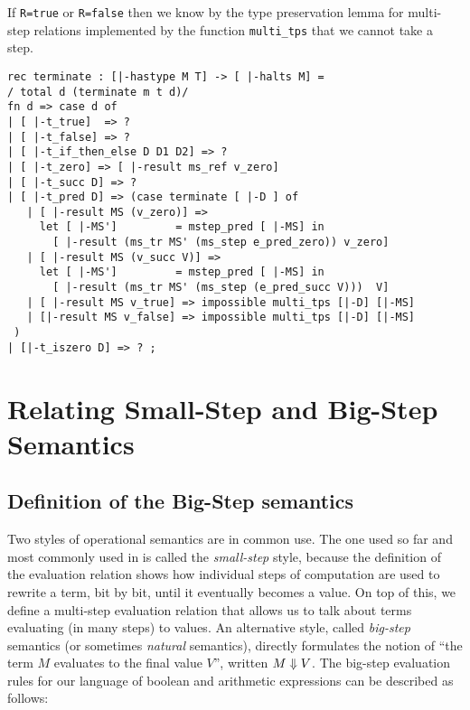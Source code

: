 If \lstinline!R=true! or \lstinline!R=false! then we know by the type
preservation lemma for multi-step relations implemented by the
function \lstinline!multi_tps! that we cannot take a step.



\begin{lstlisting}
rec terminate : [|-hastype M T] -> [ |-halts M] =
/ total d (terminate m t d)/
fn d => case d of
| [ |-t_true]  => ?
| [ |-t_false] => ?
| [ |-t_if_then_else D D1 D2] => ?
| [ |-t_zero] => [ |-result ms_ref v_zero]
| [ |-t_succ D] => ?
| [ |-t_pred D] => (case terminate [ |-D ] of
   | [ |-result MS (v_zero)] =>
     let [ |-MS']         = mstep_pred [ |-MS] in
       [ |-result (ms_tr MS' (ms_step e_pred_zero)) v_zero]
   | [ |-result MS (v_succ V)] =>
     let [ |-MS']         = mstep_pred [ |-MS] in
       [ |-result (ms_tr MS' (ms_step (e_pred_succ V)))  V]
   | [ |-result MS v_true] => impossible multi_tps [|-D] [|-MS]
   | [|-result MS v_false] => impossible multi_tps [|-D] [|-MS]
 )
| [|-t_iszero D] => ? ;
\end{lstlisting}


\section{Relating Small-Step and Big-Step Semantics}
\label{sec:small-to-big}
\subsection{Definition of the Big-Step semantics}

Two styles of operational semantics are in common use. The one used so far and
most commonly used in \cite{TAPL} is called the {\em small-step} style, because
the definition of the evaluation relation shows how individual steps of
computation are used to rewrite a term, bit by bit, until it eventually becomes
a value. On top of this, we define a multi-step evaluation relation that allows
us to talk about terms evaluating (in many steps) to values. An alternative
style, called {\em big-step} semantics (or sometimes {\em natural} semantics),
directly formulates the notion of ``the term $M$ evaluates to the final value $V$'',
written $M \Downarrow V$. The big-step evaluation rules for our language of
boolean and arithmetic expressions can be described as follows:

